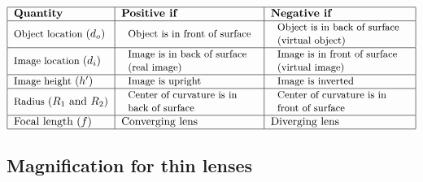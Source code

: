 \documentclass{article}
\begin{document}
\[
\begin{tabular}{|l|l|l|}
\hline
\textbf{Quantity} & \textbf{Positive if} & \textbf{Negative if} \\ \hline
{\small Object location }$\left( d_{o}\right) $ & 
\begin{tabular}{l}
{\small Object is in front of surface} \\ 
\end{tabular}
& 
\begin{tabular}{l}
{\small Object is in back of surface} \\ 
{\small (virtual object)}%
\end{tabular}%
{\small \ } \\ \hline
{\small Image location }$\left( d_{i}\right) $ & 
\begin{tabular}{l}
{\small Image is in back of surface} \\ 
{\small (real image)}%
\end{tabular}
& 
\begin{tabular}{l}
{\small Image is in front of surface } \\ 
{\small (virtual image)}%
\end{tabular}
\\ \hline
{\small Image height }$\left( h^{\prime }\right) $ & 
\begin{tabular}{l}
{\small Image is upright}%
\end{tabular}
& 
\begin{tabular}{l}
{\small Image is inverted}%
\end{tabular}
\\ \hline
{\small Radius }$\left( R_{1}\text{ and }R_{2}\right) $ & 
\begin{tabular}{l}
{\small Center of curvature is in} \\ 
{\small back of surface}%
\end{tabular}%
{\small \ } & 
\begin{tabular}{l}
{\small Center of curvature is in} \\ 
{\small front of surface}%
\end{tabular}%
{\small \ } \\ \hline
Focal length $\left( f\right) $ & Converging lens & Diverging lens \\ \hline
\end{tabular}%
\]

\subsection{Magnification for thin lenses}
\end{document}
